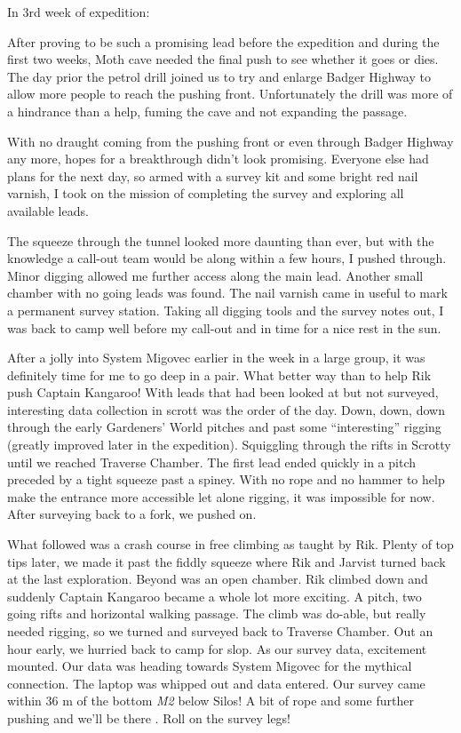 In 3rd week of expedition:

After proving to be such a promising lead before the expedition and
during the first two weeks, Moth cave needed the final push to see
whether it goes or dies. The day prior the petrol drill joined us to try
and enlarge Badger Highway to allow more people to reach the pushing
front. Unfortunately the drill was more of a hindrance than a help,
fuming the cave and not expanding the passage.

With no draught coming from the pushing front or even through Badger
Highway any more, hopes for a breakthrough didn't look promising.
Everyone else had plans for the next day, so armed with a survey kit and
some bright red nail varnish, I took on the mission of completing the
survey and exploring all available leads.

The squeeze through the tunnel looked more daunting than ever, but with
the knowledge a call-out team would be along within a few hours, I
pushed through. Minor digging allowed me further access along the main
lead. Another small chamber with no going leads was found. The nail
varnish came in useful to mark a permanent survey station. Taking all
digging tools and the survey notes out, I was back to camp well before
my call-out and in time for a nice rest in the sun.

After a jolly into System Migovec earlier in the week in a large group,
it was definitely time for me to go deep in a pair. What better way than
to help Rik push Captain Kangaroo! With leads that had been looked at
but not surveyed, interesting data collection in scrott was the order of
the day. Down, down, down through the early Gardeners' World pitches and
past some ``interesting'' rigging (greatly improved later in the
expedition). Squiggling through the rifts in Scrotty until we reached
Traverse Chamber. The first lead ended quickly in a pitch preceded by a
tight squeeze past a spiney. With no rope and no hammer to help make the
entrance more accessible let alone rigging, it was impossible for now.
After surveying back to a fork, we pushed on.

What followed was a crash course in free climbing as taught by Rik.
Plenty of top tips later, we made it past the fiddly squeeze where Rik
and Jarvist turned back at the last exploration. Beyond was an open
chamber. Rik climbed down and suddenly Captain Kangaroo became a whole
lot more exciting. A pitch, two going rifts and horizontal walking
passage. The climb was do-able, but really needed rigging, so we turned
and surveyed back to Traverse Chamber. Out an hour early, we hurried
back to camp for slop. As our survey data, excitement mounted. Our data
was heading towards System Migovec for the mythical connection. The
laptop was whipped out and data entered. Our survey came within 36 m of
the bottom \emph{M2} below Silos! A bit of rope and some further pushing
and we'll be there . Roll on the survey legs!

